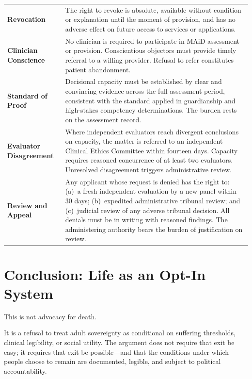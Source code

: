 \documentclass[11pt, letterpaper]{article}
\begin{document}
\begin{longtable}{>{\bfseries\sffamily\small}p{3cm} p{10.5cm}}
Revocation
  & The right to revoke is absolute, available without condition or
    explanation until the moment of provision, and has no adverse effect
    on future access to services or applications. \\[6pt]

Clinician Conscience
  & No clinician is required to participate in MAiD assessment or provision.
    Conscientious objectors must provide timely referral to a willing
    provider. Refusal to refer constitutes patient abandonment. \\[6pt]

Standard of Proof
  & Decisional capacity must be established by clear and convincing evidence
    across the full assessment period, consistent with the standard applied
    in guardianship and high-stakes competency determinations.
    The burden rests on the assessment record. \\[6pt]

Evaluator Disagreement
  & Where independent evaluators reach divergent conclusions on capacity,
    the matter is referred to an independent Clinical Ethics Committee
    within fourteen days. Capacity requires reasoned concurrence of at
    least two evaluators. Unresolved disagreement triggers administrative
    review. \\[6pt]

Review and Appeal
  & Any applicant whose request is denied has the right to: (a)~a fresh
    independent evaluation by a new panel within 30 days; (b)~expedited
    administrative tribunal review; and (c)~judicial review of any adverse
    tribunal decision. All denials must be in writing with reasoned findings.
    The administering authority bears the burden of justification on review. \\

\end{longtable}

\section*{Conclusion: Life as an Opt-In System}

This is not advocacy for death.

It is a refusal to treat adult sovereignty as conditional on suffering thresholds, clinical
legibility, or social utility. The argument does not require that exit be easy; it requires
that exit be possible---and that the conditions under which people choose to remain are
documented, legible, and subject to political accountability.
\end{document}
